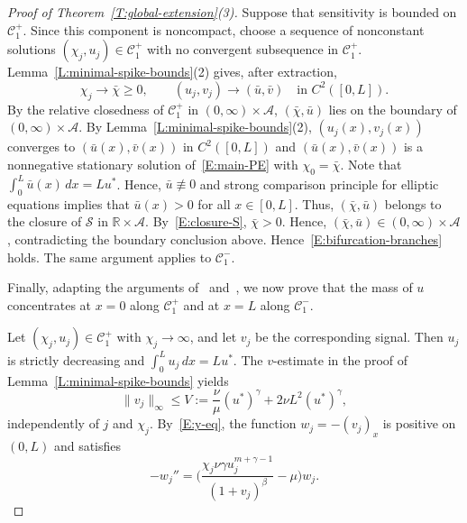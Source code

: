 \documentclass[11pt]{article} %
\theoremstyle{remark}
\theoremstyle{remark}
\numberwithin{equation}{section}
\numberwithin{figure}{section}
\numberwithin{table}{section}
\begin{document}
\begin{proof}[Proof of Theorem~\ref{T:global-extension}(3)]
  Suppose that sensitivity is bounded on $\mathcal{C}_1^+$. Since this component
  is noncompact, choose a sequence of nonconstant solutions $(\chi_j,u_j) \in
  \mathcal{C}_1^+$ with no convergent subsequence in $\mathcal{C}_1^+$.
  Lemma~\ref{L:minimal-spike-bounds}(2) gives, after extraction,
  \[
    \chi_j\to\bar{\chi}\ge0,\qquad
    (u_j,v_j)\to(\bar{u},\bar{v})
    \quad\text{in }C^2([0,L]).
  \]
  By the relative closedness of $\mathcal{C}_{1}^+$ in $(0,
  \infty)\times\mathcal{A}$, $(\bar{\chi},\bar{u})$ lies on the boundary of $(0,
  \infty)\times\mathcal{A}$. By Lemma~\ref{L:minimal-spike-bounds}(2),
  $(u_j(x),v_j(x))$ converges to $(\bar{u}(x),\bar{v}(x))$ in $C^2([0, L])$ and
  $(\bar{u}(x),\bar{v}(x))$ is a nonnegative stationary solution
  of~\eqref{E:main-PE} with $\chi_0 = \bar{\chi}$. Note that $\int_0^L \bar{u}(x)\,dx = L u^*$. Hence, $\bar{u}\not \equiv 0$ and strong comparison
  principle for elliptic equations implies that $\bar{u}(x) > 0$ for all $x \in
  [0, L]$. Thus, $(\bar{\chi},\bar{u})$ belongs to the closure of $\mathcal{S}$ in
  $\mathbb{R}\times\mathcal{A}$. By~\eqref{E:closure-S}, $\bar{\chi} > 0$. Hence,
  $(\bar{\chi},\bar{u}) \in (0, \infty)\times\mathcal{A}$, contradicting the
  boundary conclusion above. Hence~\eqref{E:bifurcation-branches} holds.  The
  same argument applies to $\mathcal{C}_1^-$.

  Finally, adapting the arguments of~\cite[Theorem 3.1]{wang.xu:13:spiky}
  and~\cite[Theorem 3.1]{li:18:spiky}, we now prove that the mass of $u$
  concentrates at $x = 0$ along $\mathcal{C}_1^+$ and at $x = L$ along
  $\mathcal{C}_1^-$.

  Let $(\chi_j,u_j) \in \mathcal{C}_1^+$ with $\chi_j \to \infty$, and let $v_j$
  be the corresponding signal. Then $u_j$ is strictly decreasing and $\int_0^L
  u_j\,dx = Lu^*$.  The $v$-estimate in the proof of
  Lemma~\ref{L:minimal-spike-bounds} yields
  \[
    \|v_j\|_\infty\le V:=\frac{\nu}{\mu}(u^*)^\gamma+2\nu L^2(u^*)^\gamma,
  \]
  independently of $j$ and $\chi_j$. By~\eqref{E:y-eq}, the function $w_j = -
  (v_j)_x$ is positive on $(0, L)$ and satisfies
  \[
    -w_j''=
    \Big(
    \frac{\chi_j\nu\gamma u_j^{m+\gamma-1}}{(1+v_j)^\beta}-\mu
    \Big)w_j.
  \]


\end{proof}
\end{document}

